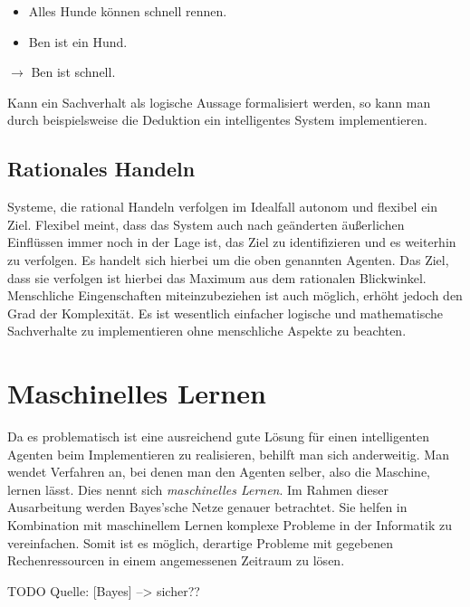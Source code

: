 \begin{itemize}
\item Alles Hunde können schnell rennen.
\item Ben ist ein Hund.
\end{itemize}
$\rightarrow$ Ben ist schnell.

Kann ein Sachverhalt als logische Aussage formalisiert werden, so kann man durch beispielsweise die Deduktion ein intelligentes System implementieren. 

\subsection{Rationales Handeln}
Systeme, die rational Handeln verfolgen im Idealfall autonom und flexibel ein Ziel. Flexibel meint, dass das System auch nach geänderten äußerlichen Einflüssen immer noch in der Lage ist, das Ziel zu identifizieren und es weiterhin zu verfolgen. Es handelt sich hierbei um die oben genannten Agenten. Das Ziel, dass sie verfolgen ist hierbei das Maximum aus dem rationalen Blickwinkel. Menschliche Eingenschaften miteinzubeziehen ist auch möglich, erhöht jedoch den Grad der Komplexität. Es ist wesentlich einfacher logische und mathematische Sachverhalte zu implementieren ohne menschliche Aspekte zu beachten.

\section{Maschinelles Lernen}
Da es problematisch ist eine ausreichend gute Lösung für einen intelligenten Agenten beim Implementieren zu realisieren, behilft man sich anderweitig. Man wendet Verfahren an, bei denen man den Agenten selber, also die Maschine, lernen lässt. Dies nennt sich \textit{maschinelles Lernen}.
Im Rahmen dieser Ausarbeitung werden Bayes'sche Netze genauer betrachtet. Sie helfen in Kombination mit maschinellem Lernen komplexe Probleme in der Informatik zu vereinfachen. Somit ist es möglich, derartige Probleme mit gegebenen Rechenressourcen in einem angemessenen Zeitraum zu lösen. 

TODO Quelle: [Bayes] --> sicher??




